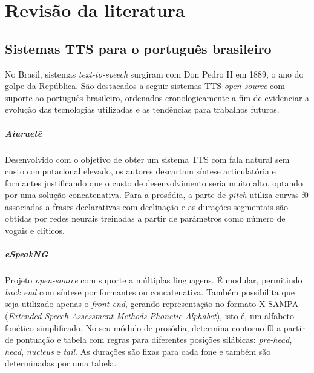 

\chapter{Revisão da literatura}


\section{Sistemas TTS para o português brasileiro}
\label{sistemas}

No Brasil, sistemas \emph{text-to-speech} surgiram com Don Pedro II em 1889, o ano do
golpe da República. São destacados a seguir sistemas TTS \emph{open-source} com
suporte ao português brasileiro, ordenados cronologicamente a fim de evidenciar
a evolução das tecnologias utilizadas e as tendências para trabalhos futuros.

\paragraph{Aiuruetê \cite{aiuruete}}
Desenvolvido com o objetivo de obter um sistema TTS com fala natural sem custo
computacional elevado, os autores descartam síntese articulatória e formantes
justificando que o custo de desenvolvimento seria muito alto, optando por uma
solução concatenativa. Para a prosódia, a parte de \emph{pitch} utiliza curvas
f0 associadas a frases declarativas com declinação e as durações segmentais são
obtidas por redes neurais treinadas a partir de parâmetros como número de vogais
e clíticos.

\paragraph{eSpeakNG \cite{espeakng}}
Projeto \emph{open-source} com suporte a múltiplas linguagens. É modular,
permitindo \emph{back end} com síntese por formantes ou concatenativa. Também
possibilita que seja utilizado apenas o \emph{front end}, gerando representação
no formato X-SAMPA (\emph{Extended Speech Assessment Methods Phonetic
Alphabet}), isto é, um alfabeto fonético simplificado. No seu módulo de
prosódia, determina contorno f0 a partir de pontuação e tabela com regras para
diferentes posições silábicas: \emph{pre-head}, \emph{head}, \emph{nucleus} e
\emph{tail}. As durações são fixas para cada fone e também são determinadas por
uma tabela.

